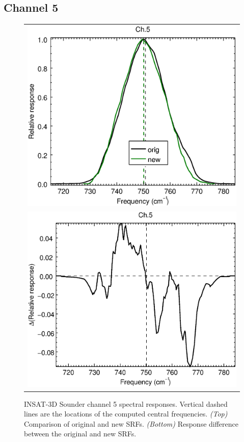 \subsection{Channel 5}
\begin{figure}[H]
  \centering
  \begin{tabular}{c}
    \includegraphics[scale=0.55]{graphics/sndr/srf/sndr_insat3d-5.eps} \\
    \includegraphics[scale=0.55]{graphics/sndr/srf/sndr_insat3d-5.difference.eps}
  \end{tabular}
  \caption{INSAT-3D Sounder channel 5 spectral responses. Vertical dashed lines are the locations of the computed central frequencies. \emph{(Top)} Comparison of original and new SRFs. \emph{(Bottom)} Response difference between the original and new SRFs.}
  \label{fig:sndr_ch5}
\end{figure}

